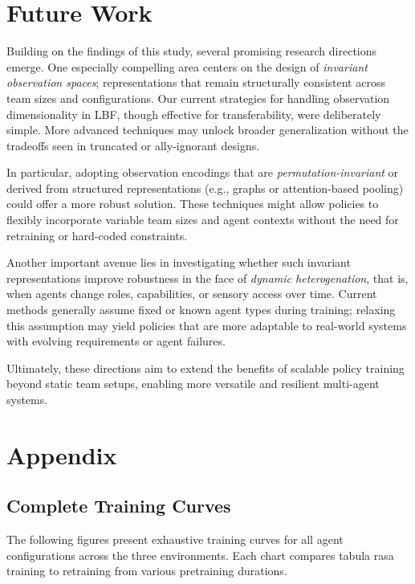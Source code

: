 \documentclass{article}
\begin{document}
\section{Future Work}

Building on the findings of this study, several promising research directions emerge. 
One especially compelling area centers on the design of \emph{invariant observation spaces};
representations that remain structurally consistent across team sizes and configurations. 
Our current strategies for handling observation dimensionality in LBF, 
though effective for transferability, were deliberately simple. More advanced techniques may 
unlock broader generalization without the tradeoffs seen in truncated or ally-ignorant designs.

In particular, adopting observation encodings that are \emph{permutation-invariant} or derived 
from structured representations (e.g., graphs or attention-based pooling) 
could offer a more robust solution. These techniques might allow policies to flexibly 
incorporate variable team sizes and agent contexts without the need for retraining or 
hard-coded constraints.

Another important avenue lies in investigating whether such invariant representations 
improve robustness in the face of \emph{dynamic heterogenation}, that is, 
when agents change roles, capabilities, or sensory access over time. 
Current methods generally assume fixed or known agent types during training; 
relaxing this assumption may yield policies that are more adaptable to real-world 
systems with evolving requirements or agent failures.

Ultimately, these directions aim to extend the benefits of scalable policy training 
beyond static team setups, enabling more versatile and resilient multi-agent systems.

\printbibliography

\clearpage
\appendix

\section*{Appendix}

\subsection*{Complete Training Curves}
The following figures present exhaustive training curves for all 
agent configurations across the three environments. Each chart compares tabula rasa 
training to retraining from various pretraining durations.
\end{document}
